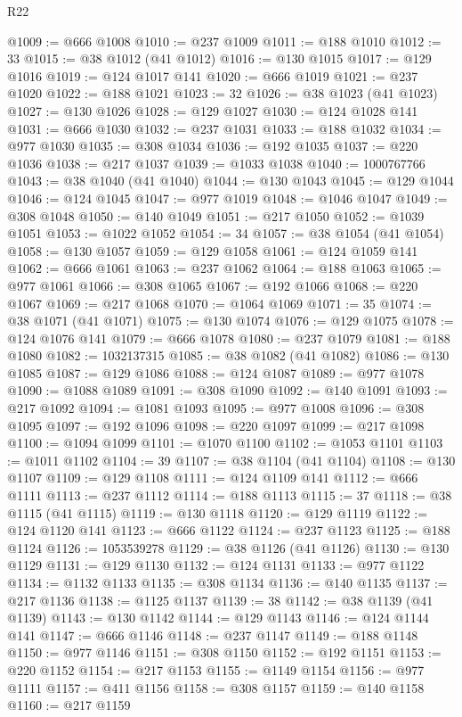 \begin{lexlean}{R22}
\begin{coremodule}
@1009 := @666 @1008
@1010 := @237 @1009
@1011 := @188 @1010
@1012 := 33
@1015 := @38 @1012 (@41 @1012)
@1016 := @130 @1015
@1017 := @129 @1016
@1019 := @124 @1017 @141
@1020 := @666 @1019
@1021 := @237 @1020
@1022 := @188 @1021
@1023 := 32
@1026 := @38 @1023 (@41 @1023)
@1027 := @130 @1026
@1028 := @129 @1027
@1030 := @124 @1028 @141
@1031 := @666 @1030
@1032 := @237 @1031
@1033 := @188 @1032
@1034 := @977 @1030
@1035 := @308 @1034
@1036 := @192 @1035
@1037 := @220 @1036
@1038 := @217 @1037
@1039 := @1033 @1038
@1040 := 1000767766
@1043 := @38 @1040 (@41 @1040)
@1044 := @130 @1043
@1045 := @129 @1044
@1046 := @124 @1045
@1047 := @977 @1019
@1048 := @1046 @1047
@1049 := @308 @1048
@1050 := @140 @1049
@1051 := @217 @1050
@1052 := @1039 @1051
@1053 := @1022 @1052
@1054 := 34
@1057 := @38 @1054 (@41 @1054)
@1058 := @130 @1057
@1059 := @129 @1058
@1061 := @124 @1059 @141
@1062 := @666 @1061
@1063 := @237 @1062
@1064 := @188 @1063
@1065 := @977 @1061
@1066 := @308 @1065
@1067 := @192 @1066
@1068 := @220 @1067
@1069 := @217 @1068
@1070 := @1064 @1069
@1071 := 35
@1074 := @38 @1071 (@41 @1071)
@1075 := @130 @1074
@1076 := @129 @1075
@1078 := @124 @1076 @141
@1079 := @666 @1078
@1080 := @237 @1079
@1081 := @188 @1080
@1082 := 1032137315
@1085 := @38 @1082 (@41 @1082)
@1086 := @130 @1085
@1087 := @129 @1086
@1088 := @124 @1087
@1089 := @977 @1078
@1090 := @1088 @1089
@1091 := @308 @1090
@1092 := @140 @1091
@1093 := @217 @1092
@1094 := @1081 @1093
@1095 := @977 @1008
@1096 := @308 @1095
@1097 := @192 @1096
@1098 := @220 @1097
@1099 := @217 @1098
@1100 := @1094 @1099
@1101 := @1070 @1100
@1102 := @1053 @1101
@1103 := @1011 @1102
@1104 := 39
@1107 := @38 @1104 (@41 @1104)
@1108 := @130 @1107
@1109 := @129 @1108
@1111 := @124 @1109 @141
@1112 := @666 @1111
@1113 := @237 @1112
@1114 := @188 @1113
@1115 := 37
@1118 := @38 @1115 (@41 @1115)
@1119 := @130 @1118
@1120 := @129 @1119
@1122 := @124 @1120 @141
@1123 := @666 @1122
@1124 := @237 @1123
@1125 := @188 @1124
@1126 := 1053539278
@1129 := @38 @1126 (@41 @1126)
@1130 := @130 @1129
@1131 := @129 @1130
@1132 := @124 @1131
@1133 := @977 @1122
@1134 := @1132 @1133
@1135 := @308 @1134
@1136 := @140 @1135
@1137 := @217 @1136
@1138 := @1125 @1137
@1139 := 38
@1142 := @38 @1139 (@41 @1139)
@1143 := @130 @1142
@1144 := @129 @1143
@1146 := @124 @1144 @141
@1147 := @666 @1146
@1148 := @237 @1147
@1149 := @188 @1148
@1150 := @977 @1146
@1151 := @308 @1150
@1152 := @192 @1151
@1153 := @220 @1152
@1154 := @217 @1153
@1155 := @1149 @1154
@1156 := @977 @1111
@1157 := @411 @1156
@1158 := @308 @1157
@1159 := @140 @1158
@1160 := @217 @1159

\end{coremodule}
\end{lexlean}
